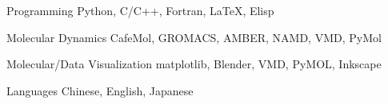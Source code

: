 

\begin{cvskills}

  \cvskill
    {Programming} %
    {Python, C/C++, Fortran, LaTeX, Elisp} %

  \cvskill
    {Molecular Dynamics} %
    {CafeMol, GROMACS, AMBER, NAMD, VMD, PyMol} %

  \cvskill
    {Molecular/Data Visualization} %
    {matplotlib, Blender, VMD, PyMOL, Inkscape} %

  \cvskill
    {Languages} %
    {Chinese, English, Japanese} %

\end{cvskills}
